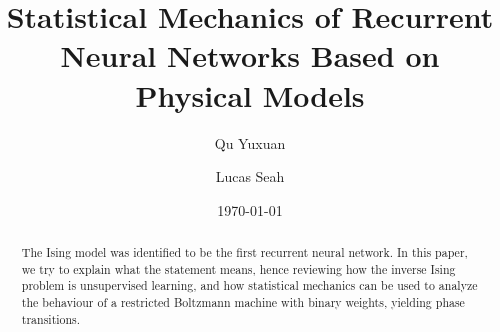 \documentclass[%
 reprint,
 amsmath,amssymb,
 aps,
]{revtex4-2}
\begin{document}

\title{Statistical Mechanics of Recurrent Neural Networks Based on Physical Models}%

\author{Qu Yuxuan}
\author{Lucas Seah}%
%




\date{\today}%

\begin{abstract}
The Ising model was identified to be the first recurrent neural network. In this paper, we try to explain what the statement means, hence reviewing how the inverse Ising problem is unsupervised learning, and how statistical mechanics can be used to analyze the behaviour of a restricted Boltzmann machine with binary weights, yielding phase transitions.
\end{abstract}
\end{document}
